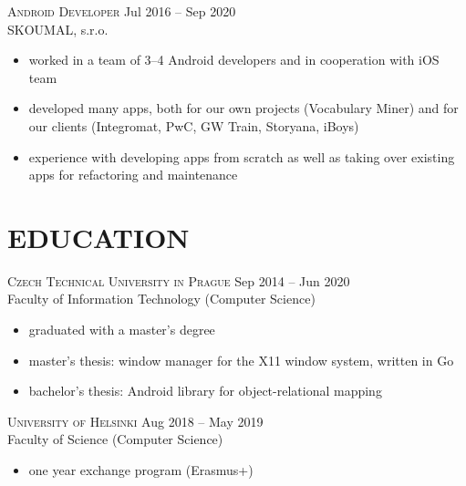 \documentclass[margin]{res}
\begin{document}
\begin{resume}
        \vspace{5mm}

        \textsc{Android Developer} \hfill Jul 2016 -- Sep 2020\\
        SKOUMAL, s.r.o.
        \vspace{2mm}
        \begin{itemize}
            \item worked in a team of 3--4 Android developers and in cooperation with iOS team
            \item developed many apps, both for our own projects (Vocabulary Miner) and for our clients (Integromat, PwC, GW Train, Storyana, iBoys)
            \item experience with developing apps from scratch as well as taking over existing apps for refactoring and maintenance
        \end{itemize}


        \section{EDUCATION}
        \textsc{Czech Technical University in Prague} \hfill Sep 2014 -- Jun 2020\\
        Faculty of Information Technology (Computer Science)
        \vspace{2mm}
        \begin{itemize}
            \item graduated with a master's degree
            \item master's thesis: window manager for the X11 window system, written in Go
            \item bachelor's thesis: Android library for object-relational mapping
        \end{itemize}

        \vspace{5mm}

        \textsc{University of Helsinki} \hfill Aug 2018 -- May 2019\\
        Faculty of Science (Computer Science)
        \vspace{2mm}
        \begin{itemize}
            \item one year exchange program (Erasmus+)
        \end{itemize}


\end{resume}
\end{document}

